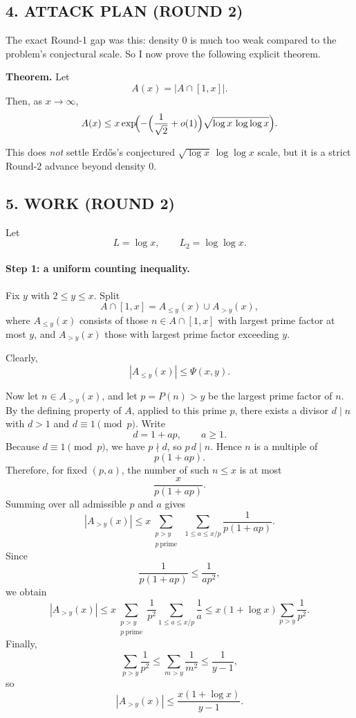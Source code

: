 \subsection*{4. ATTACK PLAN (ROUND 2)}

The exact Round-1 gap was this: density $0$ is much too weak compared to the problem's conjectural scale.
So I now prove the following explicit theorem.

\medskip
\noindent
\textbf{Theorem.}
Let
\[
A(x)=|A\cap[1,x]|.
\]
Then, as $x\to\infty$,
\[
A(x)\le x\exp\!\Bigl(-\Bigl(\frac{1}{\sqrt 2}+o(1)\Bigr)\sqrt{\log x\,\log\log x}\Bigr).
\]

\medskip
This does \emph{not} settle Erd\H{o}s's conjectured $\sqrt{\log x}\,\log\log x$ scale, but it is a strict Round-2 advance beyond density $0$.

\subsection*{5. WORK (ROUND 2)}

Let
\[
L=\log x,\qquad L_2=\log\log x.
\]

\paragraph{Step 1: a uniform counting inequality.}
Fix $y$ with $2\le y\le x$.
Split
\[
A\cap[1,x] = A_{\le y}(x)\cup A_{>y}(x),
\]
where $A_{\le y}(x)$ consists of those $n\in A\cap[1,x]$ with largest prime factor at most $y$, and $A_{>y}(x)$ those with largest prime factor exceeding $y$.

Clearly,
\[
|A_{\le y}(x)|\le \Psi(x,y).
\]

Now let $n\in A_{>y}(x)$, and let $p=P(n)>y$ be the largest prime factor of $n$.
By the defining property of $A$, applied to this prime $p$, there exists a divisor $d\mid n$ with $d>1$ and $d\equiv 1\pmod p$.
Write
\[
d=1+ap,\qquad a\ge 1.
\]
Because $d\equiv 1\pmod p$, we have $p\nmid d$, so $p\,d\mid n$.
Hence $n$ is a multiple of
\[
p(1+ap).
\]
Therefore, for fixed $(p,a)$, the number of such $n\le x$ is at most
\[
\frac{x}{p(1+ap)}.
\]
Summing over all admissible $p$ and $a$ gives
\[
|A_{>y}(x)|
\le
x\sum_{\substack{p>y\\ p\ \mathrm{prime}}}\ \sum_{1\le a\le x/p}\frac{1}{p(1+ap)}.
\]
Since
\[
\frac{1}{p(1+ap)}\le \frac{1}{a p^2},
\]
we obtain
\[
|A_{>y}(x)|
\le
x\sum_{\substack{p>y\\ p\ \mathrm{prime}}}\frac{1}{p^2}\sum_{1\le a\le x/p}\frac{1}{a}
\le
x(1+\log x)\sum_{p>y}\frac{1}{p^2}.
\]
Finally,
\[
\sum_{p>y}\frac{1}{p^2}\le \sum_{m>y}\frac{1}{m^2}\le \frac{1}{y-1},
\]
so
\[
|A_{>y}(x)|\le \frac{x(1+\log x)}{y-1}.
\]

